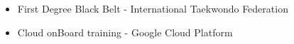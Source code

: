\vspace{5mm}
\begin{itemize}
    \setlength{\itemindent}{2em}
    \item First Degree Black Belt - International Taekwondo Federation
    \item Cloud onBoard training - Google Cloud Platform
\end{itemize}